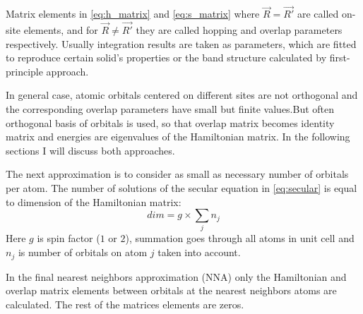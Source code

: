 Matrix elements in \ref{eq:h_matrix} and \ref{eq:s_matrix} where $\vec{R} = \vec{R'}$ are called on-site elements, and for $\vec{R} \neq \vec{R'}$ they are called hopping and overlap parameters respectively. Usually integration results are taken as parameters, which are fitted to reproduce certain solid's properties or the band structure calculated by first-principle approach. 

In general case, atomic orbitals centered on different sites are not orthogonal and the corresponding overlap parameters have small but finite values.But often orthogonal basis of orbitals is used, so that overlap matrix becomes identity matrix and energies are eigenvalues of the Hamiltonian matrix. In the following sections I will discuss both approaches. 

The next approximation is to consider as small as necessary number of orbitals per atom. The number of solutions of the secular equation in \ref{eq:secular} is equal to dimension of the Hamiltonian matrix: 
\begin{equation}
dim = g \times \sum_j n_j
\end{equation}
Here $g$ is spin factor ($1$ or $2$), summation goes through all atoms in unit cell and $n_j$ is number of orbitals on atom $j$ taken into account.

In the final nearest neighbors approximation (NNA) only the Hamiltonian and overlap matrix elements between orbitals at the nearest neighbors atoms are calculated. The rest of the matrices elements are zeros.

